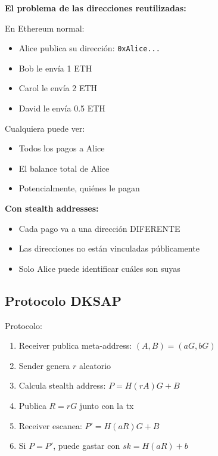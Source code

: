 \documentclass[11pt,a4paper,twoside]{book}
\begin{document}
\begin{intuicion}
\textbf{El problema de las direcciones reutilizadas:}

En Ethereum normal:
\begin{itemize}
    \item Alice publica su direcci\'on: \texttt{0xAlice...}
    \item Bob le env\'ia 1 ETH
    \item Carol le env\'ia 2 ETH
    \item David le env\'ia 0.5 ETH
\end{itemize}

Cualquiera puede ver:
\begin{itemize}
    \item Todos los pagos a Alice
    \item El balance total de Alice
    \item Potencialmente, qui\'enes le pagan
\end{itemize}

\textbf{Con stealth addresses:}
\begin{itemize}
    \item Cada pago va a una direcci\'on DIFERENTE
    \item Las direcciones no est\'an vinculadas p\'ublicamente
    \item Solo Alice puede identificar cu\'ales son suyas
\end{itemize}
\end{intuicion}

\subsection{Protocolo DKSAP}

Protocolo:
\begin{enumerate}
    \item Receiver publica meta-address: $(A, B) = (aG, bG)$
    \item Sender genera $r$ aleatorio
    \item Calcula stealth address: $P = H(rA)G + B$
    \item Publica $R = rG$ junto con la tx
    \item Receiver escanea: $P' = H(aR)G + B$
    \item Si $P = P'$, puede gastar con $sk = H(aR) + b$
\end{enumerate}
\end{document}
